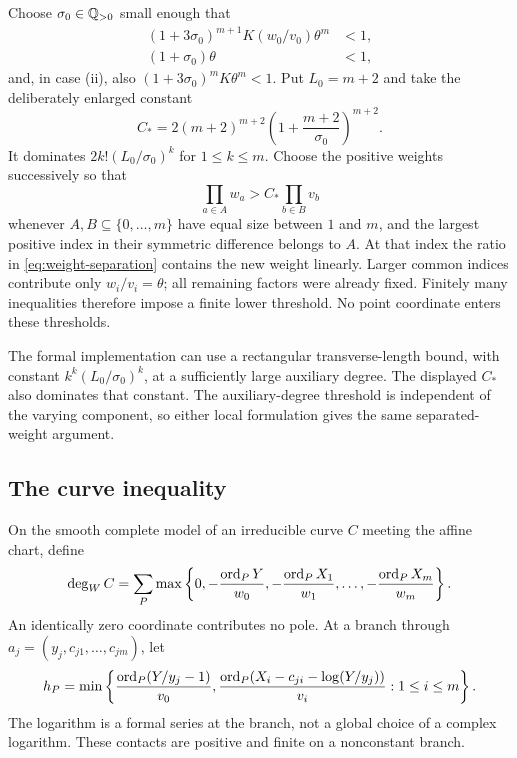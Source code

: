 Choose \(\sigma_0\in\mathbb Q_{>0}\) small enough that
\begin{equation}\label{eq:sigma}
 \begin{split}
 (1+3\sigma_0)^{m+1}K(w_0/v_0)\theta^m&<1,\\
 (1+\sigma_0)\theta&<1,
 \end{split}
\end{equation}
and, in case (ii), also
\((1+3\sigma_0)^mK\theta^m<1\).
Put \(L_0=m+2\) and take the deliberately enlarged constant
\[
 C_*=
 2(m+2)^{m+2}\left(1+\frac{m+2}{\sigma_0}\right)^{m+2}.
\]
It dominates \(2k!(L_0/\sigma_0)^k\) for \(1\le k\le m\).
Choose the positive weights successively so that
\begin{equation}\label{eq:weight-separation}
 \prod_{a\in A}w_a>C_*\prod_{b\in B}v_b
\end{equation}
whenever \(A,B\subseteq\{0,\ldots,m\}\) have equal size between
\(1\) and \(m\), and the largest positive index in their symmetric
difference belongs to \(A\).
At that index the ratio in \eqref{eq:weight-separation} contains the
new weight linearly. Larger common indices contribute only
\(w_i/v_i=\theta\); all remaining factors were already fixed.
Finitely many inequalities therefore impose a finite lower threshold.
No point coordinate enters these thresholds.

The formal implementation can use a rectangular transverse-length
bound, with constant \(k^k(L_0/\sigma_0)^k\), at a sufficiently large
auxiliary degree. The displayed \(C_*\) also dominates that constant.
The auxiliary-degree threshold is independent of the varying component,
so either local formulation gives the same separated-weight argument.

\subsection{The curve inequality}

On the smooth complete model of an irreducible curve \(C\) meeting
the affine chart, define
\begin{equation}\label{eq:weighted-degree}
 \deg_W C=\sum_P
  \max\left\{0,-\frac{\operatorname{ord}_PY}{w_0},
          -\frac{\operatorname{ord}_PX_1}{w_1},\ldots,
          -\frac{\operatorname{ord}_PX_m}{w_m}\right\}.
\end{equation}
An identically zero coordinate contributes no pole.
At a branch through \(a_j=(y_j,c_{j1},\ldots,c_{jm})\), let
\begin{equation}\label{eq:contact}
 h_P=\min\left\{
  \frac{\operatorname{ord}_P(Y/y_j-1)}{v_0},
  \frac{\operatorname{ord}_P(X_i-c_{ji}-\log(Y/y_j))}{v_i}:1\le i\le m
 \right\}.
\end{equation}
The logarithm is a formal series at the branch, not a global choice
of a complex logarithm. These contacts are positive and finite on
a nonconstant branch.

